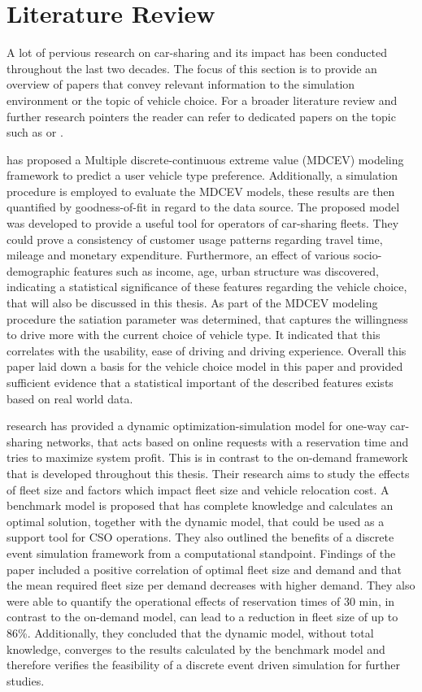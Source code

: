 \clearpage
\section{Literature Review}
\label{sec:lr}

A lot of pervious research on car-sharing and its impact has been conducted throughout
the last two decades. The focus of this section is to provide an overview of papers 
that convey relevant information to the simulation environment or the topic of vehicle
choice. For a broader literature review and further research pointers the reader can 
refer to dedicated papers on the topic such as  or .

 has proposed a Multiple discrete-continuous extreme value (MDCEV) modeling framework to predict 
a user vehicle type preference. Additionally, a simulation procedure is employed to evaluate the MDCEV
models, these results are then quantified by goodness-of-fit in regard to the data source.
The proposed model was developed to provide a useful tool for operators of car-sharing fleets.
They could prove a consistency of customer usage patterns regarding travel time, mileage and
monetary expenditure. Furthermore, an effect of various socio-demographic features such
as income, age, urban structure was discovered, indicating a statistical significance of these features
regarding the vehicle choice, that will also be discussed in this thesis.
As part of the MDCEV modeling procedure the satiation parameter was determined, that captures
the willingness to drive more with the current choice of vehicle type. It indicated that this
correlates with the usability, ease of driving and driving experience. Overall this paper
laid down a basis for the vehicle choice model in this paper and provided sufficient evidence that
a statistical important of the described features exists based on real world data.

 research has provided a dynamic optimization-simulation model for 
one-way car-sharing networks, that acts based on
online requests with a reservation time and tries to maximize system profit. This is in contrast to the on-demand
framework that is developed throughout this thesis. Their research aims to study the effects
of fleet size and factors which impact fleet size and vehicle relocation cost. A benchmark
model is proposed that has complete knowledge and calculates an optimal solution, together with
the dynamic model, that could be used as a support tool for CSO operations. They also outlined
the benefits of a discrete event simulation framework from a computational standpoint. Findings
of the paper included a positive correlation of optimal fleet size and demand and that
the mean required fleet size per demand decreases with higher demand. They also were able to
quantify the operational effects of reservation times of 30 min, in contrast to the on-demand
model, can lead to a reduction in fleet size of up to 86\%. Additionally, they
concluded that the dynamic model, without total knowledge, converges to the results calculated
by the benchmark model and therefore verifies the feasibility of a discrete event driven
simulation for further studies. 

